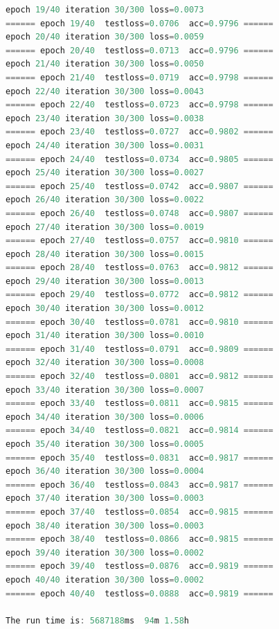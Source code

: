 \documentclass[UTF-8]{progbookcn}
\begin{document}
\begin{lstlisting}[language=C,caption={输出代码}]
epoch 19/40 iteration 30/300 loss=0.0073
====== epoch 19/40  testloss=0.0706  acc=0.9796 ======
epoch 20/40 iteration 30/300 loss=0.0059
====== epoch 20/40  testloss=0.0713  acc=0.9796 ======
epoch 21/40 iteration 30/300 loss=0.0050
====== epoch 21/40  testloss=0.0719  acc=0.9798 ======
epoch 22/40 iteration 30/300 loss=0.0043
====== epoch 22/40  testloss=0.0723  acc=0.9798 ======
epoch 23/40 iteration 30/300 loss=0.0038
====== epoch 23/40  testloss=0.0727  acc=0.9802 ======
epoch 24/40 iteration 30/300 loss=0.0031
====== epoch 24/40  testloss=0.0734  acc=0.9805 ======
epoch 25/40 iteration 30/300 loss=0.0027
====== epoch 25/40  testloss=0.0742  acc=0.9807 ======
epoch 26/40 iteration 30/300 loss=0.0022
====== epoch 26/40  testloss=0.0748  acc=0.9807 ======
epoch 27/40 iteration 30/300 loss=0.0019
====== epoch 27/40  testloss=0.0757  acc=0.9810 ======
epoch 28/40 iteration 30/300 loss=0.0015
====== epoch 28/40  testloss=0.0763  acc=0.9812 ======
epoch 29/40 iteration 30/300 loss=0.0013
====== epoch 29/40  testloss=0.0772  acc=0.9812 ======
epoch 30/40 iteration 30/300 loss=0.0012
====== epoch 30/40  testloss=0.0781  acc=0.9810 ======
epoch 31/40 iteration 30/300 loss=0.0010
====== epoch 31/40  testloss=0.0791  acc=0.9809 ======
epoch 32/40 iteration 30/300 loss=0.0008
====== epoch 32/40  testloss=0.0801  acc=0.9812 ======
epoch 33/40 iteration 30/300 loss=0.0007
====== epoch 33/40  testloss=0.0811  acc=0.9815 ======
epoch 34/40 iteration 30/300 loss=0.0006
====== epoch 34/40  testloss=0.0821  acc=0.9814 ======
epoch 35/40 iteration 30/300 loss=0.0005
====== epoch 35/40  testloss=0.0831  acc=0.9817 ======
epoch 36/40 iteration 30/300 loss=0.0004
====== epoch 36/40  testloss=0.0843  acc=0.9817 ======
epoch 37/40 iteration 30/300 loss=0.0003
====== epoch 37/40  testloss=0.0854  acc=0.9815 ======
epoch 38/40 iteration 30/300 loss=0.0003
====== epoch 38/40  testloss=0.0866  acc=0.9815 ======
epoch 39/40 iteration 30/300 loss=0.0002
====== epoch 39/40  testloss=0.0876  acc=0.9819 ======
epoch 40/40 iteration 30/300 loss=0.0002
====== epoch 40/40  testloss=0.0888  acc=0.9819 ======

The run time is: 5687188ms	94m	1.58h
\end{lstlisting}






\end{document}
